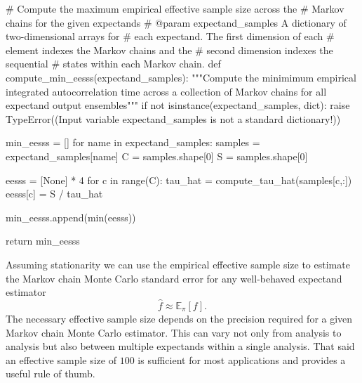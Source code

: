 \documentclass[
  letterpaper,
  DIV=11,
  numbers=noendperiod]{scrartcl}
\newenvironment{Shaded}{\begin{snugshade}}{\end{snugshade}}
\newcommand{\BuiltInTok}[1]{\textcolor[rgb]{0.00,0.23,0.31}{#1}}
\newcommand{\CommentTok}[1]{\textcolor[rgb]{0.37,0.37,0.37}{#1}}
\newcommand{\ControlFlowTok}[1]{\textcolor[rgb]{0.00,0.23,0.31}{#1}}
\newcommand{\DecValTok}[1]{\textcolor[rgb]{0.68,0.00,0.00}{#1}}
\newcommand{\KeywordTok}[1]{\textcolor[rgb]{0.00,0.23,0.31}{#1}}
\newcommand{\NormalTok}[1]{\textcolor[rgb]{0.00,0.23,0.31}{#1}}
\newcommand{\OperatorTok}[1]{\textcolor[rgb]{0.37,0.37,0.37}{#1}}
\newcommand{\PreprocessorTok}[1]{\textcolor[rgb]{0.68,0.00,0.00}{#1}}
\newcommand{\StringTok}[1]{\textcolor[rgb]{0.13,0.47,0.30}{#1}}
\newcommand{\VariableTok}[1]{\textcolor[rgb]{0.07,0.07,0.07}{#1}}
\begin{document}
\begin{Shaded}
\begin{Highlighting}[]
\CommentTok{\# Compute the maximum empirical effective sample size across the}
\CommentTok{\# Markov chains for the given expectands}
\CommentTok{\# @param expectand\_samples A dictionary of two{-}dimensional arrays for}
\CommentTok{\#                          each expectand.  The first dimension of each}
\CommentTok{\#                          element indexes the Markov chains and the}
\CommentTok{\#                          second dimension indexes the sequential}
\CommentTok{\#                          states within each Markov chain.}
\KeywordTok{def}\NormalTok{ compute\_min\_eesss(expectand\_samples):}
  \CommentTok{"""Compute the minimimum empirical integrated autocorrelation time}
\CommentTok{     across a collection of Markov chains for all expectand output}
\CommentTok{     ensembles"""}
  \ControlFlowTok{if} \KeywordTok{not} \BuiltInTok{isinstance}\NormalTok{(expectand\_samples, }\BuiltInTok{dict}\NormalTok{):}
    \ControlFlowTok{raise} \PreprocessorTok{TypeError}\NormalTok{((}\StringTok{\textquotesingle{}Input variable \textasciigrave{}expectand\_samples\textasciigrave{} \textquotesingle{}}
           \StringTok{\textquotesingle{}is not a standard dictionary!\textquotesingle{}}\NormalTok{))}
      
\NormalTok{  min\_eesss }\OperatorTok{=}\NormalTok{ []}
  \ControlFlowTok{for}\NormalTok{ name }\KeywordTok{in}\NormalTok{ expectand\_samples:}
\NormalTok{    samples }\OperatorTok{=}\NormalTok{ expectand\_samples[name]}
\NormalTok{    C }\OperatorTok{=}\NormalTok{ samples.shape[}\DecValTok{0}\NormalTok{]}
\NormalTok{    S }\OperatorTok{=}\NormalTok{ samples.shape[}\DecValTok{0}\NormalTok{]}
    
\NormalTok{    eesss }\OperatorTok{=}\NormalTok{ [}\VariableTok{None}\NormalTok{] }\OperatorTok{*} \DecValTok{4}
    \ControlFlowTok{for}\NormalTok{ c }\KeywordTok{in} \BuiltInTok{range}\NormalTok{(C):}
\NormalTok{      tau\_hat }\OperatorTok{=}\NormalTok{ compute\_tau\_hat(samples[c,:])}
\NormalTok{      eesss[c] }\OperatorTok{=}\NormalTok{ S }\OperatorTok{/}\NormalTok{ tau\_hat}
    
\NormalTok{    min\_eesss.append(}\BuiltInTok{min}\NormalTok{(eesss))}
  
  \ControlFlowTok{return}\NormalTok{ min\_eesss}
\end{Highlighting}
\end{Shaded}

Assuming stationarity we can use the empirical effective sample size to
estimate the Markov chain Monte Carlo standard error for any
well-behaved expectand estimator \[
\hat{f} \approx \mathbb{E}_{\pi}[f].
\] The necessary effective sample size depends on the precision required
for a given Markov chain Monte Carlo estimator. This can vary not only
from analysis to analysis but also between multiple expectands within a
single analysis. That said an effective sample size of \(100\) is
sufficient for most applications and provides a useful rule of thumb.
\end{document}
